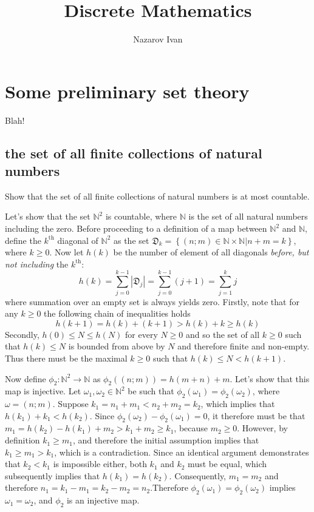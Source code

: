\documentclass[a4paper]{article}
\title{Discrete Mathematics}
\author{Nazarov Ivan}
\newcommand{\obj}[1]{\left\{{#1}\right\}}
\newcommand{\brac}[1]{{\left({#1}\right)}}
\newcommand{\abs}[1]{\left | {#1}\right |}
\begin{document}
\maketitle
\section{Some preliminary set theory} %
\label{sec:some_preliminary_set_theory}
Blah!

\subsection{the set of all finite collections of natural numbers} %
\label{sub:the_set_of_all_finite_collections_of_natural_numbers}
Show that the set of all finite collections of natural numbers is at most countable.

Let's show that the set $\mathbb{N}^2$ is countable, where $\mathbb{N}$ is the set of all natural numbers including the zero. Before proceeding to a definition of a map between $\mathbb{N}^2$ and $\mathbb{N}$, define the $k^\text{th}$ diagonal of $\mathbb{N}^2$ as the set $\mathfrak{D}_k = \obj{(n;m) \in \mathbb{N}\times\mathbb{N} \vert n+m=k}$, where $k\geq 0$. Now let $h(k)$ be the number of element of all diagonals \emph{before, but not including} the $k^\text{th}$:\[h(k) = \sum_{j=0}^{k-1} \abs{\mathfrak{D}_j} = \sum_{j=0}^{k-1} \brac{j+1} = \sum_{j=1}^k j\] where summation over an empty set is always yields zero.
Firstly, note that for any $k\geq 0$ the following chain of inequalities holds \[h(k+1) = h(k)+\brac{k+1} > h(k)+k \geq h(k)\]
Secondly, $h(0)\leq N\leq h(N)$ for every $N\geq 0$ and so the set of all $k\geq 0$ such that $h(k)\leq N$ is bounded from above by $N$ and therefore finite and non-empty. Thus there must be the maximal $k\geq 0$ such that $h(k)\leq N < h(k+1)$.

Now define $\phi_2:\mathbb{N}^2\to \mathbb{N}$ as $\phi_2\brac{(n;m)} = h(m+n)+m$. Let's show that this map is injective. Let $\omega_1, \omega_2\in\mathbb{N}^2$ be such that $\phi_2(\omega_1) = \phi_2(\omega_2)$, where $\omega = (n;m)$. Suppose $k_1 = n_1+m_1 < n_2+m_2 = k_2$, which implies that $h(k_1)+k_1<h(k_2)$. Since $\phi_2(\omega_2) - \phi_2(\omega_1) = 0$, it therefore must be that $m_1 = h(k_2)-h(k_1)+m_2 > k_1+m_2 \geq k_1$, because $m_2\geq 0$. However, by definition $k_1\geq m_1$, and therefore the initial assumption implies that $k_1\geq m_1 > k_1$, which is a contradiction. Since an identical argument demonstrates that $k_2 < k_1$ is impossible either, both $k_1$ and $k_2$ must be equal, which subsequently implies that $h(k_1) = h(k_2)$. Consequently, $m_1 = m_2$ and therefore $n_1 = k_1-m_1 = k_2-m_2 = n_2$.Therefore $\phi_2(\omega_1) = \phi_2(\omega_2)$ implies $\omega_1 = \omega_2$, and $\phi_2$ is an injective map.
\end{document}
